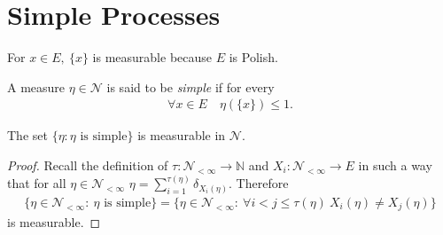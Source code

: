 \section{Simple Processes}
{\color{blue}
\begin{rmk}[]
	For $x \in E,\ \{x\}$ is measurable because $E$ is Polish.
\end{rmk}}

\begin{defn}
	A measure $\eta \in \mathcal{N}$ is said to be \emph{simple} if for every 
	\begin{align}
		\forall x \in E \quad \eta(\{x\}) \leq 1.
	\end{align}
\end{defn}

\begin{prop}[]
	The set $\{\eta: \eta \textrm{ is simple} \}$ is measurable in $ \mathcal{N} $.
\end{prop}
\begin{proof}
	Recall the definition of $\tau:\mathcal{N}_{<\infty } \to \mathbb{N}$ and $X_i: \mathcal{N}_{< \infty } \to E$ in such a way that for all $\eta \in \mathcal{N}_{<\infty }$ $\eta = \sum_{i=1}^{\tau(\eta)} \delta_{X_i(\eta)}$. Therefore
	\begin{align}
		\{\eta \in \mathcal{N}_{< \infty } :\ \eta \textrm{ is simple}\} = \{ \eta \in \mathcal{N}_{< \infty }: \ \forall i<j \leq \tau(\eta) \ X_i(\eta) \neq X_j(\eta) \}
	\end{align}
is measurable.	
\end{proof}

